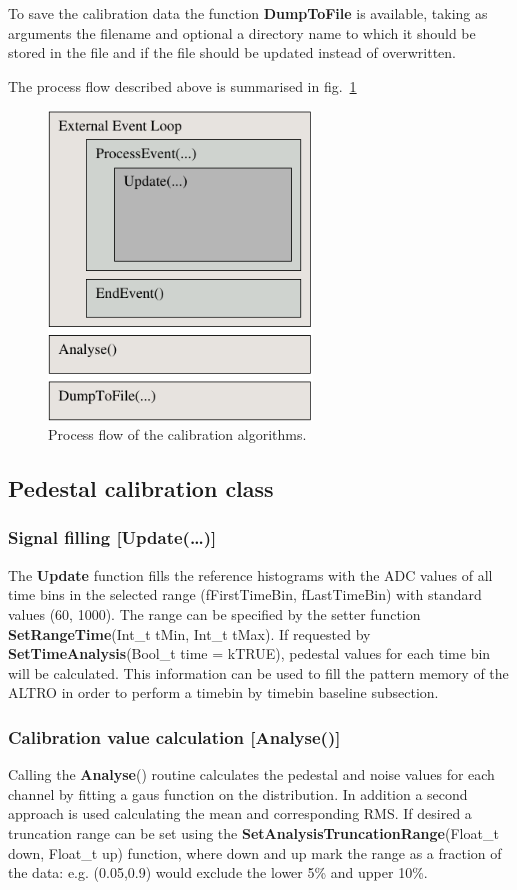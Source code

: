 To save the calibration data the function {\bf DumpToFile} is available, taking as arguments the filename and optional a directory name to which it should be stored in the file and if the file should be updated instead of overwritten.

The process flow described above is summarised in fig.\ \ref{fig:calib.calibflow}

\begin{figure}
  \centering
  \includegraphics[width=7cm]{images/ProcessFlow}
  \caption{Process flow of the calibration algorithms.}
  \label{fig:calib.calibflow}
\end{figure}

\subsection{Pedestal calibration class}
\subsubsection{Signal filling {\small [Update(\dots)]}}
The {\bf Update} function fills the reference histograms with the ADC values of all time bins in the selected range (fFirstTimeBin, fLastTimeBin) with standard values (60, 1000). The range can be specified by the setter function {\bf SetRangeTime}(Int\_t tMin, Int\_t tMax).
If requested by {\bf SetTimeAnalysis}(Bool\_t time = kTRUE), pedestal values for each time bin will be calculated. This information can be used to fill the pattern memory of the ALTRO in order to perform a timebin by timebin baseline subsection.

\subsubsection{Calibration value calculation {\small [Analyse()]}}
Calling the {\bf Analyse}() routine calculates the pedestal and noise values for each channel by fitting a gaus function on the distribution. In addition a second approach is used calculating the mean and corresponding RMS. If desired a truncation range can be set using the {\bf SetAnalysisTruncationRange}(Float\_t down, Float\_t up) function, where down and up mark the range as a fraction of the data: e.g. (0.05,0.9) would exclude the lower 5\% and upper 10\%.

